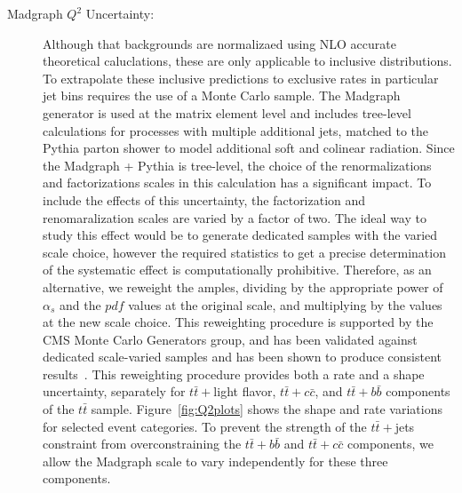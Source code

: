\begin{description}
 \item[Madgraph $Q^2$ Uncertainty:] Although that backgrounds are
   normalizaed using NLO accurate theoretical caluclations, these are
   only applicable to inclusive distributions.  To extrapolate these
   inclusive predictions to exclusive rates in particular jet bins
   requires the use of a Monte Carlo sample.  The {\sc
     Madgraph} generator is used at the matrix element level and
   includes tree-level calculations for processes with multiple
   additional jets, matched to the {\sc Pythia} parton shower to model
   additional soft and colinear radiation.  Since the {\sc Madgraph +
     Pythia} is tree-level, the choice of the renormalizations and
   factorizations scales in this calculation has a significant
   impact.  To include the effects of this uncertainty, the
   factorization and renomaralization scales are varied by a factor of
   two.  The ideal way to study this effect would be to generate
  dedicated samples with the varied scale choice, however the required
  statistics to get a precise determination of the systematic effect
  is computationally prohibitive.  Therefore, as an alternative, we
  reweight the amples, dividing by the appropriate power of $\alpha_s$
  and the $pdf$ values at the original scale, and multiplying by the
  values at the new scale choice.  This reweighting procedure is supported by
  the CMS Monte Carlo Generators group, and has been validated against
  dedicated scale-varied samples and has been shown to produce consistent
  results~\cite{Q2-REWEIGHT-PRESENTATION}.  This reweighting procedure
  provides both a rate and a shape uncertainty, separately for
  $t\bar{t}+$light flavor, $t\bar{t}+c\bar{c}$, and
  $t\bar{t}+b\bar{b}$ components of the $t\bar{t}$ sample.
  Figure~\ref{fig:Q2plots} shows the shape and rate variations for
  selected event categories.  To prevent the strength of the
  $t\bar{t}+$jets constraint from overconstraining the
  $t\bar{t}+b\bar{b}$ and $t\bar{t}+c\bar{c}$ components, we allow the
  Madgraph scale to vary independently for these three components. 


\end{description}

